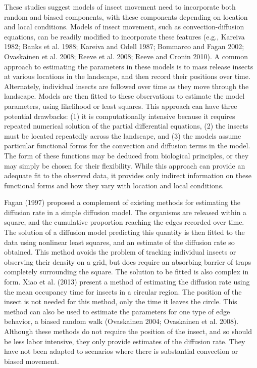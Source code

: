 \documentclass[11pt]{article}
\begin{document}
These studies suggest models of insect movement need to incorporate both random and biased components, with these components depending on location and local conditions.  Models of insect movement, such as convection-diffusion equations, can be readily modified to incorporate these features (e.g., Kareiva 1982; Banks et al. 1988; Kareiva and Odell 1987; Bommarco and Fagan 2002; Ovaskainen et al. 2008; Reeve et al. 2008; Reeve and Cronin 2010).  A common approach to estimating the parameters in these models is to mass release insects at various locations in the landscape, and then record their positions over time.  Alternately, individual insects are followed over time as they move through the landscape.  Models are then fitted to these observations to estimate the model parameters, using likelihood or least squares.  This approach can have three potential drawbacks: (1) it is computationally intensive because it requires repeated numerical solution of the partial differential equations, (2) the insects must be located repeatedly across the landscape, and (3) the models  assume particular functional forms for the convection and diffusion terms in the model.  The form of these functions may be deduced from biological principles, or they may simply be chosen for their flexibility.  While this approach can provide an adequate fit to the observed data, it provides only indirect information on these functional forms and how they vary with location and local conditions.  

Fagan (1997) proposed a complement of existing methods for estimating the diffusion rate in a simple diffusion model.  The organisms are released within a square, and the cumulative proportion reaching the edges recorded over time.  The solution of a diffusion model predicting this quantity is then fitted to the data using nonlinear least squares, and an estimate of the diffusion rate so obtained.  This method avoids the problem of tracking individual insects or observing their density on a grid, but does require an absorbing barrier of traps completely surrounding the square.  The solution to be fitted is also complex in form.  Xiao et al. (2013) present a method of estimating the diffusion rate using the mean occupancy time for insects in a circular region.  The position of the insect is not needed for this method, only the time it leaves the circle.  This method can also be used to estimate the parameters for one type of edge behavior, a biased random walk (Ovaskainen 2004; Ovaskainen et al. 2008).  Although these methods do not require the position of the insect, and so should be less labor intensive, they only provide estimates of the diffusion rate.  They have not been adapted to scenarios where there is substantial convection or biased movement.  
\end{document}
